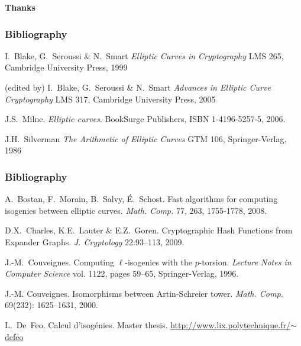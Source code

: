 \documentclass[10pt]{beamer}
\newcommand{\0}{\mathcal{O}}  %
\begin{document}

\begin{frame}
  \begin{center}
    \Large
    \textbf{Thanks}
  \end{center}
\end{frame}


\begin{frame}
  \frametitle{Bibliography}

  \begin{thebibliography}{1}
    \beamertemplatebookbibitems
    
   I.~Blake, G.~Seroussi \& N.~Smart
    \newblock \emph{Elliptic Curves in Cryptography}
    \newblock LMS 265, Cambridge University Press, 1999
    
   (edited by) I.~Blake, G.~Seroussi \& N.~Smart
    \newblock \emph{Advances in Elliptic Curve Cryptography}
    \newblock LMS 317, Cambridge University Press, 2005
        
   J.S.~Milne.
    \newblock \emph{Elliptic curves}.
    \newblock BookSurge Publishers, ISBN 1-4196-5257-5, 2006.

   J.H.~Silverman
    \newblock \emph{The Arithmetic of Elliptic Curves}
    \newblock GTM 106, Springer-Verlag, 1986
        
  \end{thebibliography}
\end{frame}

\begin{frame}
  \frametitle{Bibliography}

  \begin{thebibliography}{1}
    \beamertemplatearticlebibitems
    
   A.~Bostan,
    F.~Morain, B.~Salvy, É.~Schost.  \newblock Fast algorithms for
    computing isogenies between elliptic curves.
    \newblock \emph{Math. Comp.} 77, 263, 1755-1778, 2008.
    
    D.X.~Charles, K.E.~Lauter \& E.Z.~Goren.
    \newblock Cryptographic Hash Functions from Expander Graphs.
    \newblock \emph{J. Cryptology} 22:93--113, 2009.
    
  J.-M.~Couveignes.
    \newblock Computing $\ell$-isogenies with the $p$-torsion.
    \newblock \emph{Lecture Notes in Computer Science} vol. 1122, pages 59--65,
    Springer-Verlag, 1996.
    
   J.-M. Couveignes.
    \newblock Isomorphisms between {A}rtin-{S}chreier tower.
    \newblock \emph{Math. Comp.} 69(232): 1625--1631, 2000.

   L.~De~Feo.  \newblock Calcul d'isogénies.
    \newblock Master
    thesis. \href{http://www.lix.polytechnique.fr/~defeo/papers/master.pdf}{http://www.lix.polytechnique.fr/$\sim$defeo}

  \end{thebibliography}
\end{frame}
\end{document}
